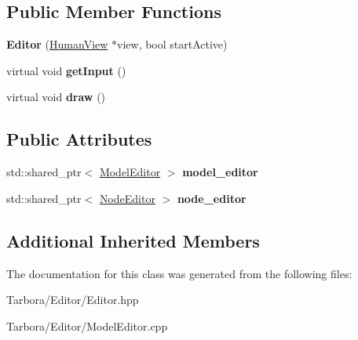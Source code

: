 \subsection*{Public Member Functions}
\begin{DoxyCompactItemize}
\item 
\mbox{\label{classTarbora_1_1Editor_a18df23a4933529187d0be5b5ed888d15}} 
{\bfseries Editor} (\hyperlink{classTarbora_1_1HumanView}{Human\+View} $\ast$view, bool start\+Active)
\item 
\mbox{\label{classTarbora_1_1Editor_abda8f6310f84da26b10e421e16824ca7}} 
virtual void {\bfseries get\+Input} ()
\item 
\mbox{\label{classTarbora_1_1Editor_a12c8f8675b4745e6a303ea1b6132766c}} 
virtual void {\bfseries draw} ()
\end{DoxyCompactItemize}
\subsection*{Public Attributes}
\begin{DoxyCompactItemize}
\item 
\mbox{\label{classTarbora_1_1Editor_a044526f8e2770401422709dc275f8bc2}} 
std\+::shared\+\_\+ptr$<$ \hyperlink{classTarbora_1_1ModelEditor}{Model\+Editor} $>$ {\bfseries model\+\_\+editor}
\item 
\mbox{\label{classTarbora_1_1Editor_aa69790f697b3a9b5fe4a03573c2bc020}} 
std\+::shared\+\_\+ptr$<$ \hyperlink{classTarbora_1_1NodeEditor}{Node\+Editor} $>$ {\bfseries node\+\_\+editor}
\end{DoxyCompactItemize}
\subsection*{Additional Inherited Members}


The documentation for this class was generated from the following files\+:\begin{DoxyCompactItemize}
\item 
Tarbora/\+Editor/Editor.\+hpp\item 
Tarbora/\+Editor/Model\+Editor.\+cpp\end{DoxyCompactItemize}
